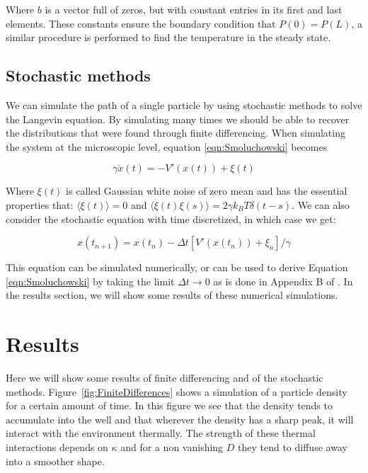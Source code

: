 \documentclass[11pt]{article} %
\begin{document}
Where $b$ is a vector full of zeros, but with constant entries in its first and last elements. These constants ensure the boundary condition that $P(0) = P(L)$, a similar procedure is performed to find the temperature in the steady state.
\subsection{Stochastic methods}
We can simulate the path of a single particle by using stochastic methods to solve the Langevin equation. By simulating many times we should be able to recover the distributions that were found through finite differencing. When simulating the system  at the microscopic level, equation \ref{eqn:Smoluchowski} becomes \cite{Reimann2001}

\begin{equation}
\gamma \dot{x}(t) = -V'(x(t)) + \xi(t)
\end{equation}

Where $\xi(t)$ is called Gaussian white noise of zero mean and has the essential properties that: $\langle \xi(t) \rangle = 0$ and $\langle \xi(t) \xi(s) \rangle = 2 \gamma k_B T \delta(t - s) $. We can also consider the stochastic equation with time discretized, in which case we get:

\begin{equation}
x(t_{n+1}) = x(t_n) - \Delta t [V'(x(t_n)) + \xi_n]/\gamma
\end{equation}

This equation can be simulated numerically, or can be used to derive Equation \ref{eqn:Smoluchowski} by taking the limit $\Delta t \to 0$ as is done in Appendix B of \cite{Reimann2001}. In the results section, we will show some results of these numerical simulations.

\section{Results}
Here we will show some results of finite differencing and of the stochastic methods. Figure~\ref{fig:FiniteDifferences} shows a simulation of a particle density for a certain amount of time. In this figure we see that the density tends to accumulate into the well and that wherever the density has a sharp peak, it will interact with the environment thermally. The strength of these thermal interactions depends on $\kappa$ and for a non vanishing $D$ they tend to diffuse away into a smoother shape.
\end{document}
